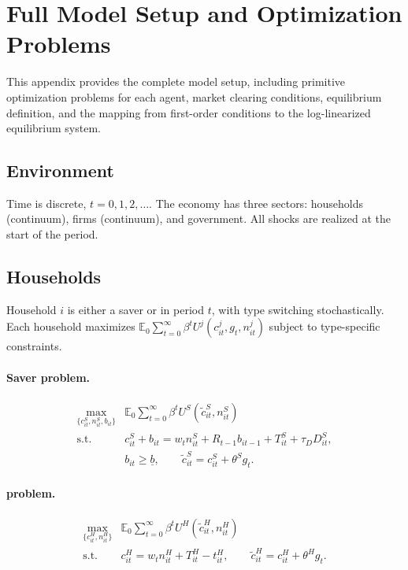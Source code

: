 \section{Full Model Setup and Optimization Problems}\label{app:setup}

This appendix provides the complete model setup, including primitive
optimization problems for each agent, market clearing conditions, equilibrium
definition, and the mapping from first-order conditions to the log-linearized
equilibrium system.

\subsection{Environment}
Time is discrete, $t=0,1,2,\dots$. The economy has three sectors: households
(continuum), firms (continuum), and government. All shocks are realized at the
start of the period.

\subsection{Households}\label{app:households-full}
Household $i$ is either a saver or \HtM{} in period $t$, with type switching
stochastically. Each household maximizes
$\mathbb{E}_{0}\sum_{t=0}^{\infty}\beta^{t}U^{j}(c^{j}_{it},g_{t},n^{j}_{it})$
subject to type-specific constraints.

\paragraph{Saver problem.}
\begin{align*}
  \max_{\{c^{S}_{it},n^{S}_{it},b_{it}\}} & \mathbb{E}_{0}\sum_{t=0}^{\infty}\beta^{t}U^{S}(\tilde c^{S}_{it},n^{S}_{it})\\
  \text{s.t.}\quad & c^{S}_{it}+b_{it}=w_{t}n^{S}_{it}+R_{t-1}b_{it-1}+T^{S}_{it}+\tau_{D}D^{S}_{it},\\
  & b_{it}\ge\underline{b},\qquad \tilde c^{S}_{it}=c^{S}_{it}+\theta^{S}g_{t}.
\end{align*}

\paragraph{\HtM{} problem.}
\begin{align*}
  \max_{\{c^{H}_{it},n^{H}_{it}\}} & \mathbb{E}_{0}\sum_{t=0}^{\infty}\beta^{t}U^{H}(\tilde c^{H}_{it},n^{H}_{it})\\
  \text{s.t.}\quad & c^{H}_{it}=w_{t}n^{H}_{it}+T^{H}_{it}-t^{H}_{it},\qquad
  \tilde c^{H}_{it}=c^{H}_{it}+\theta^{H}g_{t}.
\end{align*}

